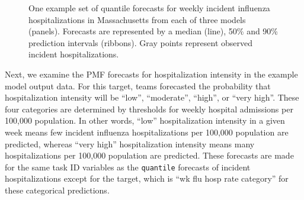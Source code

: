 \documentclass[
  letterpaper,
  DIV=11,
  numbers=noendperiod]{scrartcl}
\begin{document}
\begin{figure}[H]


\caption{\label{fig-plot-ex-mods}One example set of quantile forecasts
for weekly incident influenza hospitalizations in Massachusetts from
each of three models (panels). Forecasts are represented by a median
(line), 50\% and 90\% prediction intervals (ribbons). Gray points
represent observed incident hospitalizations.}

\end{figure}%

Next, we examine the PMF forecasts for hospitalization intensity in the
example model output data. For this target, teams forecasted the
probability that hospitalization intensity will be ``low'',
``moderate'', ``high'', or ``very high''. These four categories are
determined by thresholds for weekly hospital admissions per 100,000
population. In other words, ``low'' hospitalization intensity in a given
week means few incident influenza hospitalizations per 100,000
population are predicted, whereas ``very high'' hospitalization
intensity means many hospitalizations per 100,000 population are
predicted. These forecasts are made for the same task ID variables as
the \texttt{quantile} forecasts of incident hospitalizations except for
the target, which is ``wk flu hosp rate category'' for these categorical
predictions.
\end{document}
